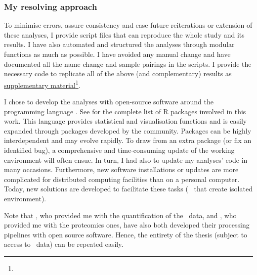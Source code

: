 \subsubsection*{My resolving approach}
To minimise errors,
assure consistency and ease future reiterations or extension of these analyses,
I provide script files that can reproduce the whole study and its results.
I have also automated and structured the analyses through modular functions
as much as possible.
I have avoided any manual change and
have documented all the name change and sample pairings in the scripts.
I provide the necessary code to replicate all of the above (and complementary) results
as \href{https://github.com/barzine/BaselineAtlas/tree/thesis.}{supplementary
material}\footnote{}.

I chose to develop the analyses with open-source software
around the programming language .
See  for the complete list of \textsf{R} packages
involved in this work.
This language provides statistical and visualisation functions
and is easily expanded through packages developed by the community.
Packages can be highly interdependent and may evolve rapidly.
To draw from an extra package (or fix an identified bug),
a comprehensive and time-consuming update of the working environment
will often ensue.
In turn, I had also to update my analyses' code in many occasions.
Furthermore, new software installations or updates are more complicated
for distributed computing facilities than on a personal computer.
Today, new solutions are developed to facilitate these tasks
(\eg\  that create isolated environment).

Note that \nuno, who provided me with the quantification of the \gtex\ data,
and \james, who provided me with the proteomics ones,
have also both developed their processing pipelines with open source software.
Hence, the entirety of the thesis (subject to access to \gtex\ data)
can be repeated easily.\mybr\

